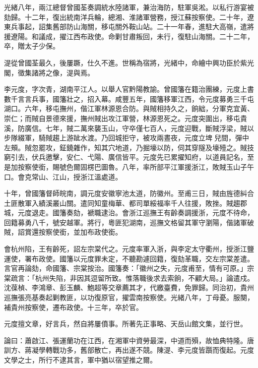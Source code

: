 \begin{pinyinscope}
光緒八年，兩江總督曾國荃奏調統水陸諸軍，兼治海防，駐軍吳淞。以私行游宴被劾歸。十二年，復出統南洋兵輪，總湘、淮諸軍營務，授江蘇按察使。二十年，遼東兵事起，詔集舊部防山海關，移屯關外鞍山站。二十一年春，進駐大高嶺，遣將援遼陽。和議成，擢江西布政使。命剿甘肅叛回，未行，復駐山海關。二十二年，卒，贈太子少保。

湜從曾國荃最久，後屢蹶，仕久不進。世稱為宿將，光緒中，命繪中興功臣於紫光閣，徵集諸將之像，湜與焉。

李元度，字次青，湖南平江人。以舉人官黔陽教諭。曾國籓在籍治團練，元度上書數千言言兵事，國籓壯之，招入幕。咸豐五年，國籓移軍江西，令元度募勇三千屯湖口。六年，移屯撫州，偕江軍林源恩合防。與賊相持久之，餉絀，分軍克宜黃、崇仁；而賊自景德來援，撫州賊出攻江軍營，林源恩死之。元度突圍出，移屯貴溪，防廣信。七年，賊二萬來襲玉山，守卒僅七百人，元度迎戰，斷賊浮梁，賊以步隊綴軍，騎賊趨上游跐水渡。乃回城拒守，被攻兩晝夜，元度立埤兒間，彈中左頰。賊忽罷攻，鉦鐃雜作，知其穴地道，乃掘壕以防，伺其穿隧及壕殪之。賊技窮引去，伏兵邀擊，安仁、弋陽、廣信皆平。元度先已累擢知府，以道員記名，至是加按察使銜，賜號色爾固楞巴圖魯。八年，率所部平江軍援浙江，敗賊玉山子午口。會克常山、江山，授浙江溫處道。

十年，曾國籓督師皖南，調元度安徽寧池太道，防徽州。至甫三日，賊由旌德糾合土匪散軍入績溪叢山關。遣同知童梅華、都司單綏福率千人往援，敗挫。賊趨郡城，元度退走。國籓奏劾，褫職逮治。會浙江巡撫王有齡奏調援浙，元度不待命，回籍募勇八千，號安越軍。將行，粵匪犯湖南，巡撫文格留其軍守瀏陽，偕諸軍破賊，詔賞還按察使銜，並加布政使銜。

會杭州陷，王有齡死，詔左宗棠代之。元度率軍入浙，與李定太守衢州，授浙江鹽運使，署布政使。國籓以元度罪未定，不聽勘遽回籍，復劾革職，交左宗棠差遣。言官再論劾，命國籓、宗棠按治。國籓奏：「徽州之失，元度甫至，情有可原。」宗棠疏言：「杭州失陷，非因其逗留所致。惟落職後求去索餉，不顧大局。」論遣戍。沈葆楨、李鴻章、彭玉麟、鮑超等交章薦其才，代繳臺費，免罪歸。同治初，貴州巡撫張亮基奏起剿教匪，以功復原官，擢雲南按察使。光緒八年，丁母憂。服闋，補貴州按察使，遷布政使。十三年，卒於官。

元度擅文章，好言兵，然自將屢僨事。所著先正事略、天岳山館文集，並行世。

論曰：蕭啟江、張運蘭功在江西，在湘軍中資勞最深，中道而殞，故恤典特隆。唐訓方、蔣凝學轉戰功多，舊部散亡，再出遂不競。陳湜、李元度皆躓而復起。元度文學之士，所行不逮其言，軍中猶以宿望推之爾。


\end{pinyinscope}